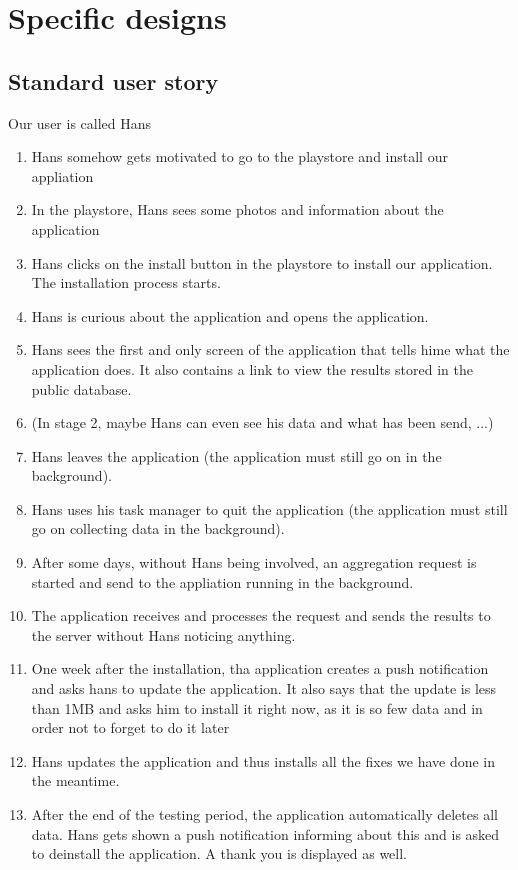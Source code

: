 \section{Specific designs}
\subsection{Standard user story}
Our user is called Hans
\begin{enumerate}
	\item Hans somehow gets motivated to go to the playstore and install our appliation
	\item In the playstore, Hans sees some photos and information about the application
	\item Hans clicks on the install button in the playstore to install our application. The installation process starts.
	\item Hans is curious about the application and opens the application.
	\item Hans sees the first and only screen of the application that tells hime what the application does. It also contains a link to view the results stored in the public database.
	\item (In stage 2, maybe Hans can even see his data and what has been send, ...)
	\item Hans leaves the application (the application must still go on in the background).
	\item Hans uses his task manager to quit the application (the application must still go on collecting data in the background).
	\item After some days, without Hans being involved, an aggregation request is started and send to the appliation running in the background.
	\item The application receives and processes the request and sends the results to the server without Hans noticing anything.
	\item One week after the installation, tha application creates a push notification and asks hans to update the application. It also says that the update is less than 1MB and asks him to install it right now, as it is so few data and in order not to forget to do it later
	\item Hans updates the application and thus installs all the fixes we have done in the meantime.
	\item After the end of the testing period, the application automatically deletes all data. Hans gets shown a push notification informing about this and is asked to deinstall the application. A thank you is displayed as well.
\end{enumerate}

